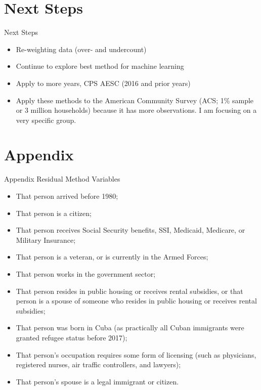 \documentclass{beamer}	%
\begin{document}
\section{Next Steps}
\begin{frame}{Next Steps}
\begin{itemize}
	\item Re-weighting data (over- and undercount)
	\item Continue to explore best method for machine learning 
	\item Apply to more years, CPS AESC (2016 and prior years)
	\item Apply these methods to the American Community Survey (ACS; 1\% sample or 3 million households) because it has more observations. I am focusing on a very specific group.
\end{itemize}
\end{frame}

\section{Appendix}
\begin{frame} [shrink=20]{Appendix} %
Residual Method Variables
\begin{itemize}
	\item That person arrived before 1980;
	\item That person is a citizen;
	\item That person receives Social Security benefits, SSI, Medicaid, Medicare, or Military Insurance;
	\item That person is a veteran, or is currently in the Armed Forces;
	\item That person works in the government sector;
	\item That person resides in public housing or receives rental subsidies, or that person is a spouse of someone who resides in public housing or receives rental subsidies;
	\item That person was born in Cuba (as practically all Cuban immigrants were granted refugee status before 2017);
	\item That person's occupation requires some form of licensing (such as physicians, registered nurses, air traffic controllers, and lawyers);
	\item That person's spouse is a legal immigrant or citizen.
\end{itemize}
\end{frame}
\end{document}
